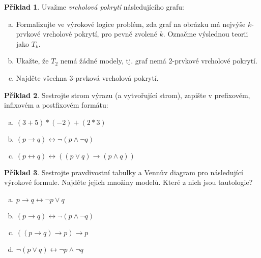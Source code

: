 \documentclass[a4paper]{article}
\theoremstyle{definition}
\newtheorem{problem}{Příklad}
\begin{document}
\medskip\begin{problem}
Uvažme \emph{vrcholová pokrytí} následujícího grafu:
\begin{center}
\end{center}
\begin{enumerate}[(a)]
    \item Formalizujte ve výrokové logice problém, zda graf na obrázku má nejvýše $k$-prvkové vrcholové pokrytí, pro pevně zvolené $k$. Označme výslednou teorii jako $T_k$.
    \item Ukažte, že $T_2$ nemá žádné modely, tj. graf nemá 2-prvkové vrcholové pokrytí.
    \item Najděte všechna 3-prvková vrcholová pokrytí.
\end{enumerate}
\end{problem}


\medskip\begin{problem}
    Sestrojte strom výrazu (a vytvořující strom), zapište v prefixovém, infixovém a postfixovém formátu:
    \begin{enumerate}[(a)]
        \item $(3+5)*(-2)+(2*3)$
        \item $(p \to q) \leftrightarrow \neg (p \wedge \neg q)$
        \item $(p \leftrightarrow q) \leftrightarrow ((p \vee q) \to (p \wedge q))$
    \end{enumerate}
\end{problem}


\medskip\begin{problem}
Sestrojte pravdivostní tabulky a Vennův diagram pro následující výrokové formule. Najděte jejich množiny modelů. Které z nich jsou tautologie?
\begin{enumerate}[(a)]
\item $p \to q \leftrightarrow \neg p \vee q$
\item $(p \to q) \leftrightarrow \neg (p \wedge \neg q)$
\item $((p\to q)\to p)\to p$
\item $\neg (p\vee q)\leftrightarrow \neg p\wedge \neg q$
\end{enumerate}
\end{problem}
\end{document}
